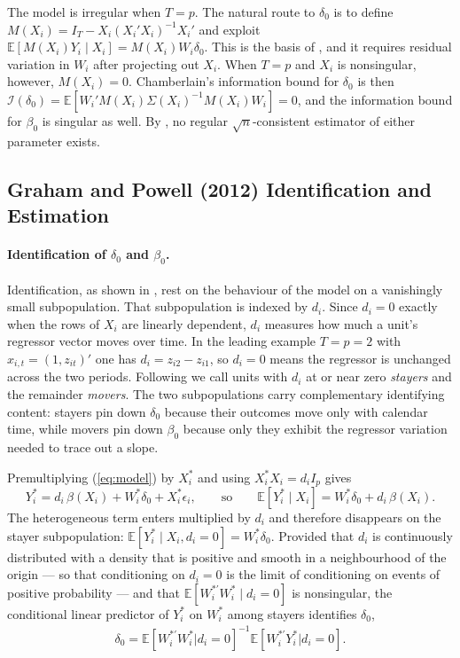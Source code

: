 \documentclass{article}
\newcommand{\E}{\mathbb{E}}
\begin{document}
The model is irregular when $T=p$. The natural route to $\delta_0$ is to define $M(X_i)=I_T-X_i(X_i'X_i)^{-1}X_i'$ and exploit $\E[M(X_i)Y_i\mid X_i]=M(X_i)W_i\delta_0$. This is the basis of \cite{CHAMBERLAIN1992}, and it requires residual variation in $W_i$ after projecting out $X_i$. When $T=p$ and $X_i$ is nonsingular, however, $M(X_i)=0$. Chamberlain's information bound for $\delta_0$ is then $\mathcal{I}(\delta_0)=\E[W_i'M(X_i)\Sigma(X_i)^{-1}M(X_i)W_i]=0$, and the information bound for $\beta_0$ is singular as well. By \cite{CHAMBERLAIN1992}, no regular $\sqrt{n}$-consistent estimator of either parameter exists. 

\subsection{Graham and Powell (2012) Identification and Estimation}
\paragraph{Identification of $\delta_0$ and $\beta_0$.}
Identification, as shown in \cite{grahampowell}, rest on the behaviour of the model on a vanishingly small subpopulation. That subpopulation is indexed by $d_i$. Since $d_i=0$ exactly when the rows of $X_i$ are linearly dependent, $d_i$ measures how much a unit's regressor vector moves over time. In the leading example $T=p=2$ with $x_{i,t}=(1,z_{it})'$ one has $d_i=z_{i2}-z_{i1}$, so $d_i=0$ means the regressor is unchanged across the two periods. Following \cite{grahampowell} we call units with $d_i$ at or near zero \emph{stayers} and the remainder \emph{movers}. The two subpopulations carry complementary identifying content: stayers pin down $\delta_0$ because their outcomes move only with calendar time, while movers pin down $\beta_0$ because only they exhibit the regressor variation needed to trace out a slope.

Premultiplying (\ref{eq:model}) by $X_i^{*}$ and using $X_i^{*}X_i=d_iI_p$ gives
\begin{equation}\label{eq:adj_model}
    Y_i^{*} = d_i\,\beta(X_i) + W_i^{*}\delta_0 + X_i^{*}\epsilon_i,
    \qquad\text{so}\qquad
    \E\!\left[Y_i^{*}\mid X_i\right] = W_i^{*}\delta_0 + d_i\,\beta(X_i).
\end{equation}
The heterogeneous term enters multiplied by $d_i$ and therefore disappears on the stayer subpopulation: $\E[Y_i^{*}\mid X_i, d_i=0]=W_i^{*}\delta_0$. Provided that $d_i$ is continuously distributed with a density that is positive and smooth in a neighbourhood of the origin --- so that conditioning on $d_i=0$ is the limit of conditioning on events of positive probability --- and that $\E[W_i^{*\prime}W_i^{*}\mid d_i=0]$ is nonsingular, the conditional linear predictor of $Y_i^{*}$ on $W_i^{*}$ among stayers identifies $\delta_0$,
\begin{align}\label{eq:estimand2}
    \delta_0 = \E[W_i^{*\prime}W_i^{*}|d_i=0]^{-1}\E[W_i^{*\prime}Y_i^{*}|d_i=0].
\end{align}
 
\end{document}
